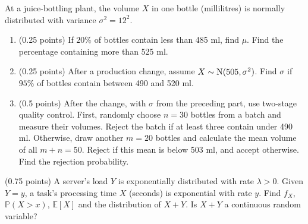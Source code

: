\documentclass[a4paper]{report}
\begin{document}
\begin{problem}
At a juice-bottling plant, the volume $X$ in one bottle (millilitres) is normally distributed with variance $\sigma^2=12^2$.
\begin{enumerate}
    \item (0.25 points) If $20\%$ of bottles contain less than 485 ml, find $\mu$. Find the percentage containing more than 525 ml.
    \item (0.25 points) After a production change, assume $X\sim\mbox N(505,\sigma^2)$. Find $\sigma$ if $95\%$ of bottles contain between 490 and 520 ml.
    \item (0.5 points) After the change, with $\sigma$ from the preceding part, use two-stage quality control. First, randomly choose $n=30$ bottles from a batch and measure their volumes. Reject the batch if at least three contain under 490 ml. Otherwise, draw another $m=20$ bottles and calculate the mean volume of all $m+n=50$. Reject if this mean is below 503 ml, and accept otherwise. Find the rejection probability.
\end{enumerate}
\end{problem}

\begin{problem} (0.75 points)
A server's load $Y$ is exponentially distributed with rate $\lambda>0$. Given $Y=y$, a task's processing time $X$ (seconds) is exponential with rate $y$. Find $f_X$, $\mathbb P(X>x)$, $\mathbb E[X]$ and the distribution of $X+Y$. Is $X+Y$ a continuous random variable?
\end{problem}
\end{document}
